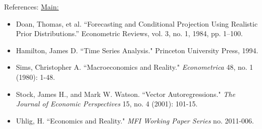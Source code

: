\documentclass{beamer}
\begin{document}
	\begin{frame}{References:}
		\underline{Main:}
		\small{
		\begin{itemize}
			\item Doan, Thomas, et al. “Forecasting and Conditional Projection Using Realistic Prior Distributions.” Econometric Reviews, vol. 3, no. 1, 1984, pp. 1–100.			
			\item Hamilton, James D. ``Time Series Analysis." Princeton University Press, 1994.			
			\item Sims, Christopher A. ``Macroeconomics and Reality." \textit{Econometrica} 48, no. 1 (1980): 1-48.
			\item Stock, James H., and Mark W. Watson. ``Vector Autoregressions." \textit{The Journal of Economic Perspectives} 15, no. 4 (2001): 101-15.
			\item Uhlig, H. ``Economics and Reality." \textit{MFI Working Paper Series} no. 2011-006.			
		\end{itemize}}
	\end{frame}
\end{document}
